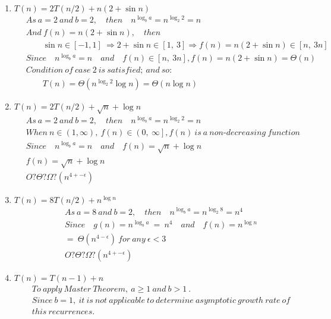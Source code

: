 \documentclass[a4paper]{scrartcl}
\begin{document}
\begin{enumerate}[label=(\alph*)]
  \item $T (n) = 2T (n/2) + n(2 + \sin{n})$
\begin{align*}
  &\ As\ a = 2\ and\ b = 2,\quad then \quad n^{\log_b{a}} = n^{\log_2{2}} = n\\
  &\ And\ f(n) = n(2 + \sin{n}),\quad then\\ &\
  \qquad \sin{n} \in \left[-1, 1\right]\ \Rightarrow 2+\sin{n} \in \left[1,\ 3\right] \Rightarrow f(n) = n\left(2 + \sin{n}\right) \in \left[n,\ 3n\right]\\ &\
  Since\quad n^{\log_b{a}} = n \quad and \quad f(n) \in \left[n,\ 3n\right], f(n) = n(2 + \sin{n}) = \Theta(n)\\ &\
  Condition\ of\ case\ 2\ is\ satisfied;\ and\ so:\\
  &\ \qquad T(n)=\Theta\left({n^{\log_2{2}}\log{n}}\right) =\Theta\left({n\log{n}}\right)
\end{align*}
\item $T (n) = 2T (n/2) + \sqrt{n} + \log{n}$
\begin{align*}
  &\ As\ a = 2\ and\ b = 2,\quad then \quad n^{\log_b{a}} = n^{\log_2{2}} = n\\
  &\ When\ n \in \left(1, \infty\right),\ f(n) \in \left(0,\ \infty\right], f(n)\ is\ a\ non\text{-}decreasing\ function\\ &\
  Since\quad n^{\log_b{a}} = n \quad and \quad f(n) = \sqrt{n} + \log{n}\\ &\
  f(n) = \sqrt{n} + \log{n} \\ &\
  O? \Theta ? \Omega ? (n^{4+-\epsilon})
\end{align*}
\item $T (n) = 8T (n/2) + n^{\log{n}}$
\begin{align*}
  &\ As\ a = 8\ and\ b = 2,\quad then \quad n^{\log_b{a}} = n^{\log_2{8}} = n^4\\ &\
  Since\quad g(n)=n^{\log_b{a}}\ =\ n^4 \quad and \quad f(n) = n^{\log{n}}\\ &\
  =\ \Theta(n^{4-\epsilon})\ for\ any\ \epsilon < 3\\ &\
  O? \Theta ? \Omega ? (n^{4+-\epsilon})
\end{align*}
\item $T (n) = T (n - 1) + n$
\begin{align*}
  &\ To\ apply\ Master\ Theorem,\ a \geq 1\ and\ b > 1\ .\\ &\
  Since\ b = 1,\ it\ is\ not\ applicable\ to\ determine\ asymptotic\ growth\ rate\ of\\ &\
  this\ recurrences.
\end{align*}
\end{enumerate}
\end{document}
